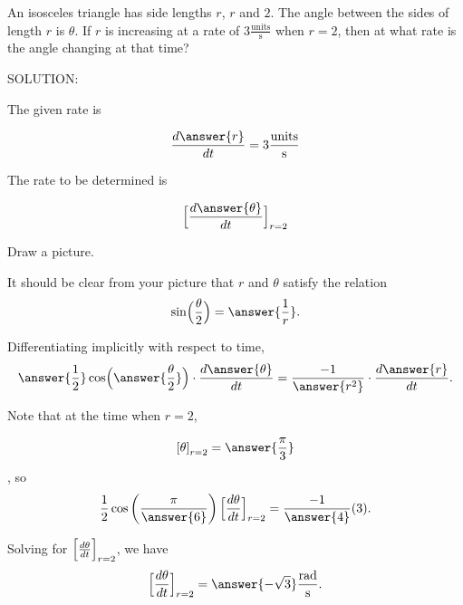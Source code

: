 \documentclass{ximera}
\author{Steven Gubkin\and Nela Lakos}
\begin{document}
\begin{exercise}

An isosceles triangle has side lengths $r$, $r$ and $2$.  The angle
between the sides of length $r$ is $\theta$.  If $r$ is increasing at
a rate of $3 \frac{\textrm{units}}{\textrm{s}}$ when $r = 2$, then at
what rate is the angle changing at that time?

SOLUTION:

The given rate is  

\[
 \frac{d\answer{r}}{dt}=3 \frac{\textrm{units}}{\textrm{s}}
\]

The rate to be determined is  

\[
\Bigl[ \frac{d\answer{\theta}}{dt}\Bigr]_{r=2}
\]


  Draw a picture.
\begin{hint}

  
  \begin{hint}
\begin{image}
\end{image}
\end{hint}

\end{hint}


  It should be clear from your picture that $r$ and $\theta$ satisfy the relation 
  \[
  \sin\Bigl(\frac{\theta}{2}\Bigr) = \answer{\frac{1}{r}}.
  \]



  Differentiating implicitly with respect to time, 
  \[
  \answer{\frac{1}{2}}\cos\Bigl(\answer{\frac{\theta}{2}}\Bigr) \cdot \frac{d\answer{\theta}}{dt} = \frac{-1}{\answer{r^2}}\cdot
  \frac{d\answer{r}}{dt}.
  \]



  Note that at the time when $r = 2$, 
  
  \[
 \left[ \theta \right]_{r=2}=\answer{ \frac{\pi}{3}}
  \]
  , so
  \[
  \frac{1}{2} \cos\left(\frac{\pi}{\answer{6}}\right)\Bigl[ \frac{d\theta}{dt}\Bigr]_{r=2} = \frac{-1}{\answer{4}} (3).
  \]



  Solving for $\Bigl[ \frac{d\theta}{dt}\Bigr]_{r=2} $, we have
  \[
\Bigl[ \frac{d\theta}{dt}\Bigr]_{r=2}  = \answer{-\sqrt{3}}\frac{\textrm{rad}}{\textrm{s}}.
  \]


\end{exercise}
\end{document}
